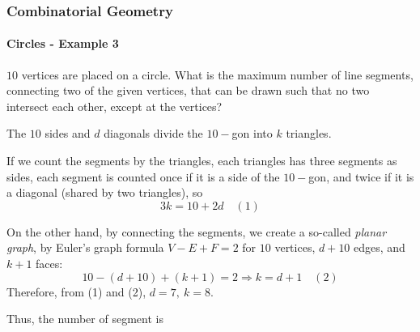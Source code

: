 \documentclass[8pt,xcolor=table,dvipsnames]{beamer}
\begin{document}
\begin{frame}[t]
    \frametitle{Combinatorial Geometry}
    \framesubtitle{Circles - Example 3}
    \begin{example}[MIC-2021-SM2-R1-P7]
        $10$ vertices are placed on a circle.
        What is the maximum number of line segments, connecting two of the given vertices,
        that can be drawn such that no two intersect each other, except at the vertices?
    \end{example}
    The $10$ sides and $d$ diagonals divide the $10-$gon into $k$ triangles.
    
    If we count the segments by the triangles, each triangles has three segments as sides,
    each segment is counted once if it is a side of the $10-$gon,
    and twice if it is a diagonal (shared by two triangles), so
    \[
        3k = 10 + 2d \quad(1)
    \]
    
    On the other hand, by connecting the segments, we create a so-called \textit{planar graph},
    by Euler's graph formula $V-E+F=2$ for $10$ vertices, $d+10$ edges, and $k+1$ faces:
    \[
        10 - (d+10) + (k+1) = 2 \Rightarrow k = d+1 \quad(2)
    \]
    Therefore, from (1) and (2), $d=7,\ k=8.$
    
    Thus, the number of segment is 
\end{frame}
\end{document}
